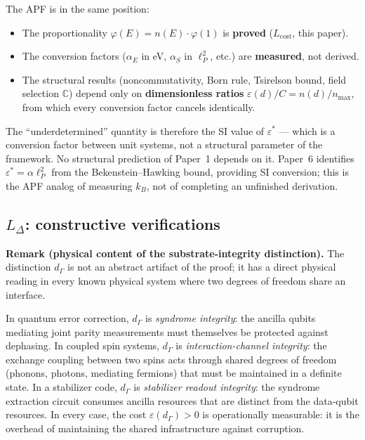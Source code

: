 \documentclass[11pt]{article}
\theoremstyle{remark}
\begin{document}
The APF is in the same position:
\begin{itemize}[nosep,leftmargin=2em,itemsep=2pt]
\item The proportionality $\varphi(E) = n(E) \cdot \varphi(1)$ is \textbf{proved} ($L_{\mathrm{cost}}$, this paper).
\item The conversion factors ($\alpha_E$ in eV, $\alpha_S$ in $\ell_P^2$, etc.) are \textbf{measured}, not derived.
\item The structural results (noncommutativity, Born rule, Tsirelson bound, field selection $\mathbb{C}$) depend only on \textbf{dimensionless ratios} $\varepsilon(d)/C = n(d)/n_{\max}$, from which every conversion factor cancels identically.
\end{itemize}

The ``underdetermined'' quantity is therefore the SI value of $\varepsilon^*$ --- which is a conversion factor between unit systems, not a structural parameter of the framework.  No structural prediction of Paper~1 depends on it.  Paper~6 identifies $\varepsilon^* = \alpha\ell_P^2$ from the Bekenstein--Hawking bound, providing SI conversion; this is the APF analog of measuring $k_B$, not of completing an unfinished derivation.



\subsection{$L_\Delta$: constructive verifications}
\label{sec:Ldelta_verifications}



\smallskip\noindent\textbf{Remark (physical content of the substrate-integrity distinction).}  The distinction $d_\Gamma$ is not an abstract artifact of the proof; it has a direct physical reading in every known physical system where two degrees of freedom share an interface.

In quantum error correction, $d_\Gamma$ is \emph{syndrome integrity}: the ancilla qubits mediating joint parity measurements must themselves be protected against dephasing.  In coupled spin systems, $d_\Gamma$ is \emph{interaction-channel integrity}: the exchange coupling between two spins acts through shared degrees of freedom (phonons, photons, mediating fermions) that must be maintained in a definite state.  In a stabilizer code, $d_\Gamma$ is \emph{stabilizer readout integrity}: the syndrome extraction circuit consumes ancilla resources that are distinct from the data-qubit resources.  In every case, the cost $\varepsilon(d_\Gamma) > 0$ is operationally measurable: it is the overhead of maintaining the shared infrastructure against corruption.
\end{document}
